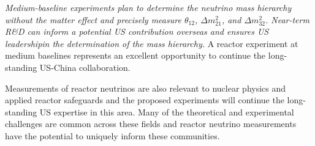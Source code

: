 {\em Medium-baseline experiments plan to determine the neutrino mass hierarchy without the matter effect and precisely measure $\theta_{12}$, $\Delta m^2_{21}$, and $\Delta m^2_{32}$. Near-term R\&D can inform a potential US contribution overseas and ensures US  leadershipin the determination of the mass hierarchy. } A reactor experiment at medium baselines represents an excellent opportunity to continue the long-standing US-China collaboration.

Measurements of reactor neutrinos are also relevant to nuclear physics and applied reactor safeguards and the proposed experiments will continue the long-standing US expertise in this area.  Many of the theoretical and experimental challenges are common across these fields and reactor neutrino measurements have the potential to uniquely inform these communities.
